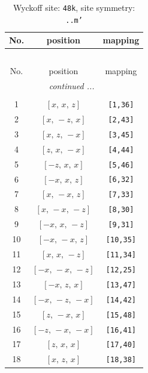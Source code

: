 \documentclass[fleqn,8pt]{jsarticle}
\begin{document}
\begin{longtable}{ccc}
\caption{Wyckoff site: {\tt 48k}, site symmetry: {\tt ..m'}}
 \\
 \hline \hline
No. & position & mapping \\ \hline \endfirsthead

\multicolumn{2}{l}{\tablename\ \thetable{}} \\
 \hline \hline
No. & position & mapping \\ \hline \endhead

 \hline \hline
\multicolumn{2}{r}{\footnotesize\it continued ...} \\ \endfoot

 \hline \hline
\multicolumn{2}{r}{} \\ \endlastfoot

1 & $\left[ x,\, x,\, z \right]$ & {\tt [1,36]} \\ \hline
2 & $\left[ x,\, - z,\, x \right]$ & {\tt [2,43]} \\ \hline
3 & $\left[ x,\, z,\, - x \right]$ & {\tt [3,45]} \\ \hline
4 & $\left[ z,\, x,\, - x \right]$ & {\tt [4,44]} \\ \hline
5 & $\left[ - z,\, x,\, x \right]$ & {\tt [5,46]} \\ \hline
6 & $\left[ - x,\, x,\, z \right]$ & {\tt [6,32]} \\ \hline
7 & $\left[ x,\, - x,\, z \right]$ & {\tt [7,33]} \\ \hline
8 & $\left[ x,\, - x,\, - z \right]$ & {\tt [8,30]} \\ \hline
9 & $\left[ - x,\, x,\, - z \right]$ & {\tt [9,31]} \\ \hline
10 & $\left[ - x,\, - x,\, z \right]$ & {\tt [10,35]} \\ \hline
11 & $\left[ x,\, x,\, - z \right]$ & {\tt [11,34]} \\ \hline
12 & $\left[ - x,\, - x,\, - z \right]$ & {\tt [12,25]} \\ \hline
13 & $\left[ - x,\, z,\, x \right]$ & {\tt [13,47]} \\ \hline
14 & $\left[ - x,\, - z,\, - x \right]$ & {\tt [14,42]} \\ \hline
15 & $\left[ z,\, - x,\, x \right]$ & {\tt [15,48]} \\ \hline
16 & $\left[ - z,\, - x,\, - x \right]$ & {\tt [16,41]} \\ \hline
17 & $\left[ z,\, x,\, x \right]$ & {\tt [17,40]} \\ \hline
18 & $\left[ x,\, z,\, x \right]$ & {\tt [18,38]} \\ \hline

\end{longtable}
\end{document}
